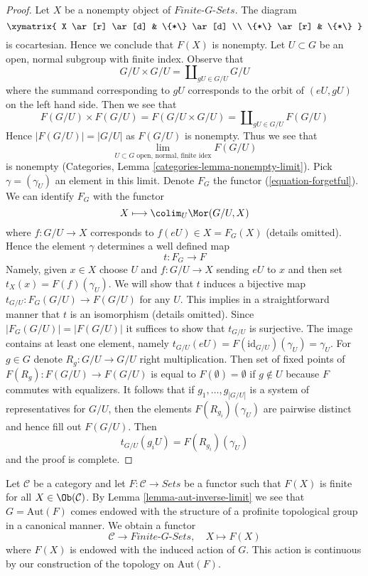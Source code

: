 \begin{proof}
Let $X$ be a nonempty object of $\textit{Finite-}G\textit{-Sets}$.
The diagram
$$
\xymatrix{
X \ar[r] \ar[d] & \{*\} \ar[d] \\
\{*\} \ar[r] & \{*\}
}
$$
is cocartesian. Hence we conclude that $F(X)$ is nonempty.
Let $U \subset G$ be an open, normal subgroup with finite index.
Observe that
$$
G/U \times G/U = \coprod\nolimits_{gU \in G/U} G/U
$$
where the summand corresponding to $gU$ corresponds to the orbit of
$(eU, gU)$ on the left hand side. Then we see that
$$
F(G/U) \times F(G/U) = F(G/U \times G/U) = \coprod\nolimits_{gU \in G/U} F(G/U)
$$
Hence $|F(G/U)| = |G/U|$ as $F(G/U)$ is nonempty. Thus we see that
$$
\lim_{U \subset G\text{ open, normal, finite idex}} F(G/U)
$$
is nonempty (Categories, Lemma \ref{categories-lemma-nonempty-limit}).
Pick $\gamma = (\gamma_U)$ an element in this limit.
Denote $F_G$ the functor (\ref{equation-forgetful}). We can identify
$F_G$ with the functor
$$
X \longmapsto \colim_U \Mor(G/U, X)
$$
where $f : G/U \to X$ corresponds to $f(eU) \in X = F_G(X)$
(details omitted). Hence the element $\gamma$ determines
a well defined map
$$
t : F_G \longrightarrow F
$$
Namely, given $x \in X$ choose $U$ and $f : G/U \to X$ sending
$eU$ to $x$ and then set $t_X(x) = F(f)(\gamma_U)$.
We will show that $t$ induces a bijective map
$t_{G/U} : F_G(G/U) \to F(G/U)$ for any $U$.
This implies in a straightforward manner that $t$
is an isomorphism (details omitted).
Since $|F_G(G/U)| = |F(G/U)|$ it suffices to show
that $t_{G/U}$ is surjective. The image contains at least
one element, namely
$t_{G/U}(eU) = F(\text{id}_{G/U})(\gamma_U) = \gamma_U$.
For $g \in G$ denote $R_g : G/U \to G/U$ right multiplication.
Then set of fixed points of $F(R_g) : F(G/U) \to F(G/U)$
is equal to $F(\emptyset) = \emptyset$ if $g \not \in U$ because $F$
commutes with equalizers. It follows that if
$g_1, \ldots, g_{|G/U|}$ is a system of representatives
for $G/U$, then the elements $F(R_{g_i})(\gamma_U)$ are pairwise distinct
and hence fill out $F(G/U)$. Then
$$
t_{G/U}(g_iU) = F(R_{g_i})(\gamma_U)
$$
and the proof is complete.
\end{proof}

\begin{example}
\label{example-from-C-F-to-G-sets}
Let $\mathcal{C}$ be a category and let $F : \mathcal{C} \to \textit{Sets}$
be a functor such that $F(X)$ is finite for all $X \in \Ob(\mathcal{C})$.
By Lemma \ref{lemma-aut-inverse-limit} we see that $G = \text{Aut}(F)$
comes endowed with the structure of a profinite topological group in a
canonical manner. We obtain a functor
\begin{equation}
\label{equation-remember}
\mathcal{C} \longrightarrow \textit{Finite-}G\textit{-Sets},\quad
X \longmapsto F(X)
\end{equation}
where $F(X)$ is endowed with the induced action of $G$. This action
is continuous by our construction of the topology on $\text{Aut}(F)$.
\end{example}

